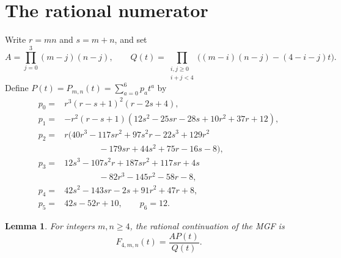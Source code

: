 \documentclass[11pt]{article}
\newtheorem{lemma}[theorem]{Lemma}
\begin{document}
\section{The rational numerator}

Write $r=mn$ and $s=m+n$, and set
\begin{equation}\label{eq:AQ}
 A=\prod_{j=0}^{3}(m-j)(n-j),\qquad
 Q(t)=\prod_{\substack{i,j\ge0\\ i+j<4}}
       \bigl((m-i)(n-j)-(4-i-j)t\bigr).
\end{equation}
Define $P(t)=P_{m,n}(t)=\sum_{a=0}^6p_a t^a$ by
\begin{equation}\label{eq:coefficients}
\begin{aligned}
 p_0={}&r^3(r-s+1)^2(r-2s+4),\\
 p_1={}&-r^2(r-s+1)(12s^2-25sr-28s+10r^2+37r+12),\\
 p_2={}&r\bigl(40r^3-117sr^2+97s^2r-22s^3+129r^2\\
       &\qquad\qquad{}-179sr+44s^2+75r-16s-8\bigr),\\
 p_3={}&12s^3-107s^2r+187sr^2+117sr+4s\\
       &\qquad\qquad{}-82r^3-145r^2-58r-8,\\
 p_4={}&42s^2-143sr-2s+91r^2+47r+8,\\
 p_5={}&42s-52r+10,\qquad p_6=12.
\end{aligned}
\end{equation}

\begin{lemma}\label{lem:rational}
For integers $m,n\ge4$, the rational continuation of the MGF is
\begin{equation}\label{eq:rational}
 F_{4,m,n}(t)=\frac{A P(t)}{Q(t)}.
\end{equation}
\end{lemma}
\end{document}
